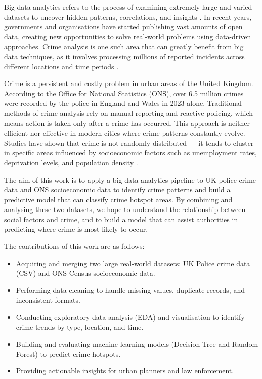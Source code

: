 \documentclass[conference]{IEEEtran}
\begin{document}
Big data analytics refers to the process of examining extremely large and varied datasets to uncover hidden patterns, correlations, and insights \cite{b1}. In recent years, governments and organisations have started publishing vast amounts of open data, creating new opportunities to solve real-world problems using data-driven approaches. Crime analysis is one such area that can greatly benefit from big data techniques, as it involves processing millions of reported incidents across different locations and time periods \cite{b2}.

Crime is a persistent and costly problem in urban areas of the United Kingdom. According to the Office for National Statistics (ONS), over 6.5 million crimes were recorded by the police in England and Wales in 2023 alone. Traditional methods of crime analysis rely on manual reporting and reactive policing, which means action is taken only after a crime has occurred. This approach is neither efficient nor effective in modern cities where crime patterns constantly evolve. Studies have shown that crime is not randomly distributed — it tends to cluster in specific areas influenced by socioeconomic factors such as unemployment rates, deprivation levels, and population density \cite{b3}.

The aim of this work is to apply a big data analytics pipeline to UK police crime data and ONS socioeconomic data to identify crime patterns and build a predictive model that can classify crime hotspot areas. By combining and analysing these two datasets, we hope to understand the relationship between social factors and crime, and to build a model that can assist authorities in predicting where crime is most likely to occur.

The contributions of this work are as follows:
\begin{itemize}
    \item Acquiring and merging two large real-world datasets: UK Police crime data (CSV) and ONS Census socioeconomic data.
    \item Performing data cleaning to handle missing values, duplicate records, and inconsistent formats.
    \item Conducting exploratory data analysis (EDA) and visualisation to identify crime trends by type, location, and time.
    \item Building and evaluating machine learning models (Decision Tree and Random Forest) to predict crime hotspots.
    \item Providing actionable insights for urban planners and law enforcement.
\end{itemize}
\end{document}
